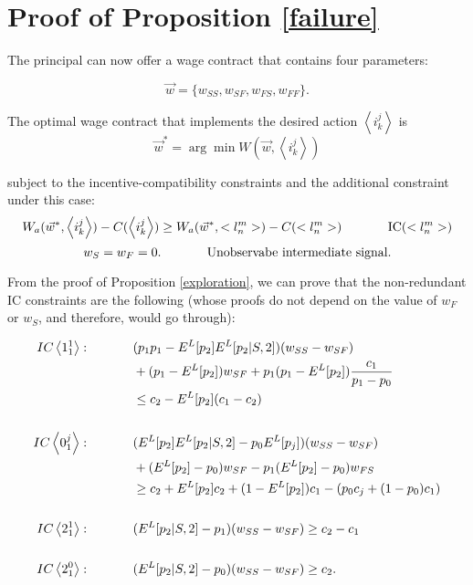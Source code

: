 \documentclass[11pt]{article} %
\theoremstyle{exampstyle}
\newcommand{\eq}[1]{\begin{align}#1\end{align}}
\newcommand{\la}{ \left < }
\newcommand{\ra}{ \right > }
\begin{document}
\newpage
\section{Proof of Proposition \ref{failure}}
The principal can now offer a wage contract that contains four parameters:

\[ \vec{w} =\{w_{SS}, w_{SF}, w_{FS}, w_{FF} \} . \]

The optimal wage contract that implements the desired action $ \la i^j_k \ra$ is
\[ \vec{w}^* = \arg\min W(\vec{w}, \la i^j_k \ra)  \]

subject to the incentive-compatibility constraints and the additional constraint under this case:
\[ W_a(\vec{w}^*, \la i^j_k \ra)  - C(\la i^j_k \ra) \ge W_a(\vec{w}^*, <l^m_n>)  - C(<l^m_n>) \hspace{.5in} \text{IC$(<l^m_n>)$} \]
\[ w_S = w_F = 0. \hspace{.5in} \text{Unobservabe intermediate signal.}  \]

From the proof of Proposition \ref{exploration}, we can prove that the non-redundant IC constraints are the following (whose proofs do not depend on the value of $w_F$ or $w_S$, and therefore, would go through):

\eq{
IC\la1^1_1\ra: \hspace{.5in} & (p_1 p_1 - E^L[p_2]E^L[p_2 | S,2] )( w_{SS} -w_{SF} ) \notag \\
& +(p_1-E^L[p_2]) w_{SF} + p_1 (p_1-E^L[p_2]) \frac{c_1}{p_1-p_0} \notag \\
& \le c_2  - E^L[p_2] (c_1 - c_2) \notag 
\\
\notag 
\\
IC\la0^j_1\ra: \hspace{.5in} & (E^L[p_2] E^L[p_2 | S,2] - p_0 E^L[p_j] ) (w_{SS} -w_{SF}) \notag \\
& + (E^L[p_2] - p_0 ) w_{SF} - p_1 (E^L[p_2] - p_0) w_{FS} \notag \\
& \ge c_2 + E^L[p_2] c_2 + (1-E^L[p_2]) c_1 - ( p_0 c_j + (1-p_0) c_1 ) \notag 
\\
\notag 
\\
IC\la2^1_1\ra: \hspace{.5in} & (E^L[p_2|S,2]-p_1)(w_{SS}-w_{SF}) \ge c_2-c_1 \notag 
\\
\notag 
\\
IC\la2^0_1\ra: \hspace{.5in} & (E^L[p_2|S,2]-p_0)(w_{SS}-w_{SF}) \ge c_2. \notag 
}
\end{document}
